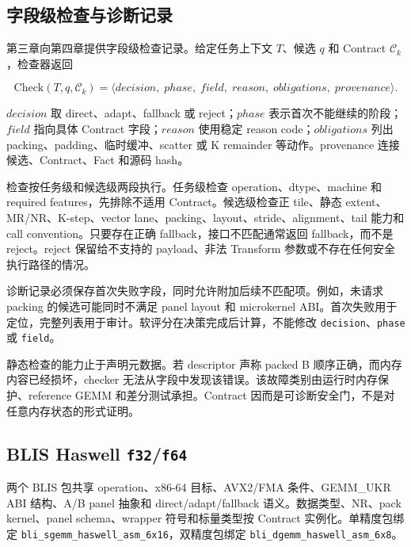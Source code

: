\subsection{字段级检查与诊断记录}

第三章向第四章提供字段级检查记录。给定任务上下文 $T$、候选 $q$ 和 Contract $\mathcal{C}_k$，检查器返回

\begin{equation}
\mathrm{Check}(T,q,\mathcal{C}_k)=
\langle
decision,\;phase,\;field,\;reason,\;obligations,\;provenance
\rangle .
\label{eq:chapter3-check-interface}
\end{equation}

$decision$ 取 direct、adapt、fallback 或 reject；$phase$ 表示首次不能继续的阶段；$field$ 指向具体 Contract 字段；$reason$ 使用稳定 reason code；$obligations$ 列出 packing、padding、临时缓冲、scatter 或 K remainder 等动作。provenance 连接候选、Contract、Fact 和源码 hash。

检查按任务级和候选级两段执行。任务级检查 operation、dtype、machine 和 required features，先排除不适用 Contract。候选级检查正 tile、静态 extent、MR/NR、K-step、vector lane、packing、layout、stride、alignment、tail 能力和 call convention。只要存在正确 fallback，接口不匹配通常返回 fallback，而不是 reject。reject 保留给不支持的 payload、非法 Transform 参数或不存在任何安全执行路径的情况。

诊断记录必须保存首次失败字段，同时允许附加后续不匹配项。例如，未请求 packing 的候选可能同时不满足 panel layout 和 microkernel ABI。首次失败用于定位，完整列表用于审计。软评分在决策完成后计算，不能修改 \texttt{decision}、\texttt{phase} 或 \texttt{field}。

静态检查的能力止于声明元数据。若 descriptor 声称 packed B 顺序正确，而内存内容已经损坏，checker 无法从字段中发现该错误。该故障类别由运行时内存保护、reference GEMM 和差分测试承担。Contract 因而是可诊断安全门，不是对任意内存状态的形式证明。

\subsection{BLIS Haswell \texttt{f32}/\texttt{f64}}

两个 BLIS 包共享 operation、x86-64 目标、AVX2/FMA 条件、GEMM\_UKR ABI 结构、A/B panel 抽象和 direct/adapt/fallback 语义。数据类型、NR、pack kernel、panel schema、wrapper 符号和标量类型按 Contract 实例化。单精度包绑定 \texttt{bli\_sgemm\_haswell\_asm\_6x16}，双精度包绑定 \texttt{bli\_dgemm\_haswell\_asm\_6x8}。

